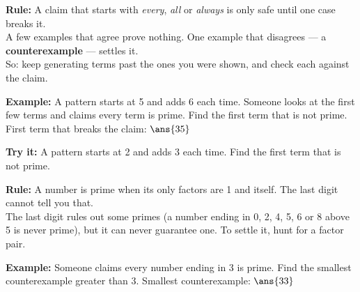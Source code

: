 \documentclass[12pt]{article}
\begin{document}


\begin{formulabox}
\textbf{Rule:} A claim that starts with \emph{every}, \emph{all} or \emph{always} is only safe until one case breaks it.\\[3pt]
A few examples that agree prove nothing. One example that disagrees --- a \textbf{counterexample} --- settles it.\\[3pt]
So: keep generating terms past the ones you were shown, and check each against the claim.
\end{formulabox}

\begin{examplebox}
\textbf{Example:} \quad A pattern starts at 5 and adds 6 each time. Someone looks at the first few terms and claims every term is prime. Find the first term that is not prime.
First term that breaks the claim: $\ans{35}$
\end{examplebox}

\begin{tryitbox}
\textbf{Try it:} \quad A pattern starts at 2 and adds 3 each time. Find the first term that is not prime.\\[2pt]
\end{tryitbox}


\begin{formulabox}
\textbf{Rule:} A number is prime when its only factors are 1 and itself. The last digit cannot tell you that.\\[3pt]
The last digit rules out some primes (a number ending in 0, 2, 4, 5, 6 or 8 above 5 is never prime), but it can never guarantee one. To settle it, hunt for a factor pair.
\end{formulabox}

\begin{examplebox}
\textbf{Example:} \quad Someone claims every number ending in 3 is prime. Find the smallest counterexample greater than 3.
Smallest counterexample: $\ans{33}$
\end{examplebox}
\end{document}
